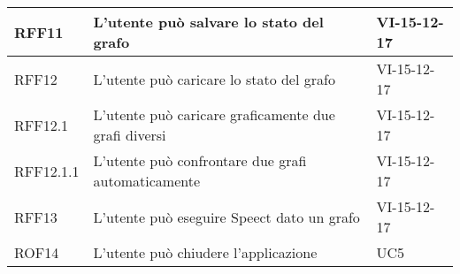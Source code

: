 \documentclass[../AnalisideiRequisiti.tex]{subfiles}
\begin{document}
\begin{longtable}{| p{3cm} | p{6cm} | p{3cm} |}
		
		\newline RFF11&
		\newline L'utente può salvare lo stato del grafo&
		\newline VI-15-12-17 
		\\[1em]
		\hline
		
		
		\newline RFF12&
		\newline L'utente può caricare lo stato del grafo&
		\newline VI-15-12-17
		\\[1em]
		\hline
		
			\newline RFF12.1&
		\newline L'utente può caricare  graficamente due grafi diversi&
		\newline VI-15-12-17
		\\[1em]
		\hline
		
			\newline RFF12.1.1&
		\newline L'utente può confrontare due grafi automaticamente&
		\newline VI-15-12-17
		\\[1em]
		\hline
		
		
		\newline RFF13&
		\newline L'utente può eseguire Speect dato un grafo&
		\newline VI-15-12-17
		\\[1em]
		\hline
		
	
		
		\newline ROF14&
		\newline L'utente può chiudere l'applicazione&
		\newline UC5
		\\[1em]
		\hline
		
		
		
	\end{longtable}
\end{document}

